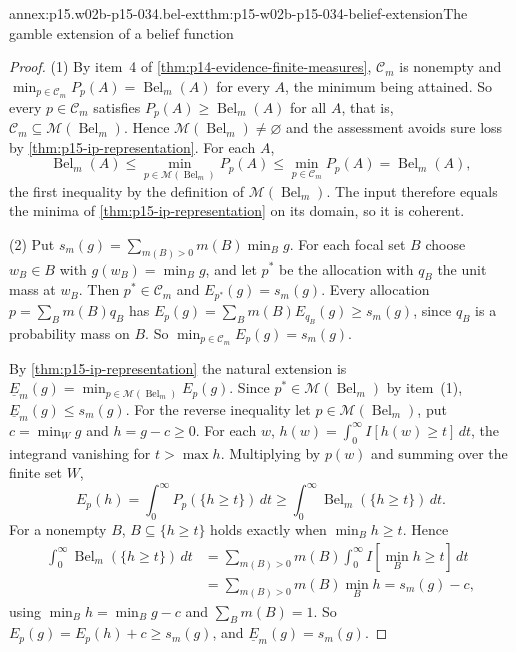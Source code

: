 \begin{annexitem}{annex:p15.w02b-p15-034.bel-ext}{thm:p15-w02b-p15-034-belief-extension}{The gamble extension of a belief function}
\begin{proof}
(1) By item~4 of \cref{thm:p14-evidence-finite-measures}, \(\mathcal C_m\)
is nonempty and \(\min_{p\in\mathcal C_m}P_p(A)=\operatorname{Bel}_m(A)\)
for every \(A\), the minimum being attained. So every \(p\in\mathcal C_m\)
satisfies \(P_p(A)\geq\operatorname{Bel}_m(A)\) for all \(A\), that is,
\(\mathcal C_m\subseteq\mathcal M(\operatorname{Bel}_m)\). Hence
\(\mathcal M(\operatorname{Bel}_m)\ne\varnothing\) and the assessment
avoids sure loss by \cref{thm:p15-ip-representation}. For each \(A\),
\[
 \operatorname{Bel}_m(A)\leq\min_{p\in\mathcal M(\operatorname{Bel}_m)}P_p(A)
 \leq\min_{p\in\mathcal C_m}P_p(A)=\operatorname{Bel}_m(A),
\]
the first inequality by the definition of \(\mathcal M(\operatorname{Bel}_m)\).
The input therefore equals the minima of \cref{thm:p15-ip-representation}
on its domain, so it is coherent.

(2) Put \(s_m(g)=\sum_{m(B)>0}m(B)\min_Bg\). For each focal set \(B\) choose
\(w_B\in B\) with \(g(w_B)=\min_Bg\), and let \(p^*\) be the allocation
with \(q_B\) the unit mass at \(w_B\). Then \(p^*\in\mathcal C_m\) and
\(E_{p^*}(g)=s_m(g)\). Every allocation \(p=\sum_Bm(B)q_B\) has
\(E_p(g)=\sum_Bm(B)E_{q_B}(g)\geq s_m(g)\), since \(q_B\) is a probability
mass on \(B\). So \(\min_{p\in\mathcal C_m}E_p(g)=s_m(g)\).

By \cref{thm:p15-ip-representation} the natural extension is
\(\underline E_m(g)=\min_{p\in\mathcal M(\operatorname{Bel}_m)}E_p(g)\).
Since \(p^*\in\mathcal M(\operatorname{Bel}_m)\) by item~(1),
\(\underline E_m(g)\leq s_m(g)\). For the reverse inequality let
\(p\in\mathcal M(\operatorname{Bel}_m)\), put \(c=\min_Wg\) and
\(h=g-c\geq0\). For each \(w\),
\(h(w)=\int_0^\infty I[h(w)\geq t]\,dt\), the integrand vanishing for
\(t>\max h\). Multiplying by \(p(w)\) and summing over the finite set
\(W\),
\[
 E_p(h)=\int_0^\infty P_p(\{h\geq t\})\,dt
 \geq\int_0^\infty\operatorname{Bel}_m(\{h\geq t\})\,dt .
\]
For a nonempty \(B\), \(B\subseteq\{h\geq t\}\) holds exactly when
\(\min_Bh\geq t\). Hence
\[
\begin{aligned}
 \int_0^\infty\operatorname{Bel}_m(\{h\geq t\})\,dt
 &=\sum_{m(B)>0}m(B)\int_0^\infty I[\min_Bh\geq t]\,dt\\
 &=\sum_{m(B)>0}m(B)\min_Bh=s_m(g)-c,
\end{aligned}
\]
using \(\min_Bh=\min_Bg-c\) and \(\sum_Bm(B)=1\). So
\(E_p(g)=E_p(h)+c\geq s_m(g)\), and \(\underline E_m(g)=s_m(g)\).


\end{proof}
\end{annexitem}
